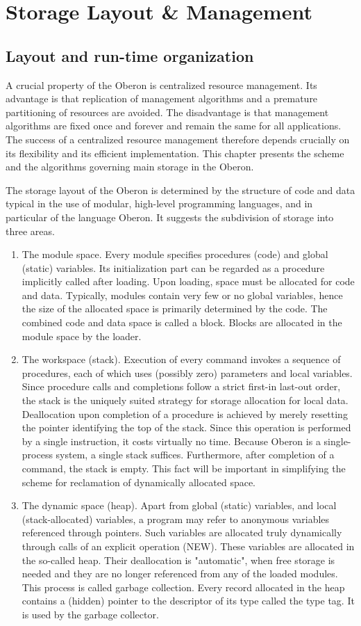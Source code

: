 \chapter{Storage Layout \& Management}
\label{ch:MM}
\section{Layout and run-time organization}
A crucial property of the Oberon is centralized resource management. Its advantage is that
replication of management algorithms and a premature partitioning of resources are avoided. The
disadvantage is that management algorithms are fixed once and forever and remain the same for
all applications. The success of a centralized resource management therefore depends crucially on
its flexibility and its efficient implementation. This chapter presents the scheme and the algorithms
governing main storage in the Oberon.

The storage layout of the Oberon is determined by the structure of code and data typical in
the use of modular, high-level programming languages, and in particular of the language Oberon. It
suggests the subdivision of storage into three areas.
\begin{enumerate}
	\item The module space. Every module specifies procedures (code) and global (static) variables. Its
initialization part can be regarded as a procedure implicitly called after loading. Upon loading, space
must be allocated for code and data. Typically, modules contain very few or no global variables,
hence the size of the allocated space is primarily determined by the code. The combined code and
data space is called a block. Blocks are allocated in the module space by the loader.
	\item The workspace (stack). Execution of every command invokes a sequence of procedures, each of
which uses (possibly zero) parameters and local variables. Since procedure calls and completions
follow a strict first-in last-out order, the stack is the uniquely suited strategy for storage allocation for
local data. Deallocation upon completion of a procedure is achieved by merely resetting the pointer
identifying the top of the stack. Since this operation is performed by a single instruction, it costs
virtually no time. Because Oberon is a single-process system, a single stack suffices. Furthermore,
after completion of a command, the stack is empty. This fact will be important in simplifying the
scheme for reclamation of dynamically allocated space.
	\item The dynamic space (heap). Apart from global (static) variables, and local (stack-allocated)
variables, a program may refer to anonymous variables referenced through pointers. Such
variables are allocated truly dynamically through calls of an explicit operation (NEW). These
variables are allocated in the so-called heap. Their deallocation is "automatic", when free storage is
needed and they are no longer referenced from any of the loaded modules. This process is called
garbage collection. Every record allocated in the heap contains a (hidden) pointer to the descriptor
of its type called the type tag. It is used by the garbage collector.
\end{enumerate}

